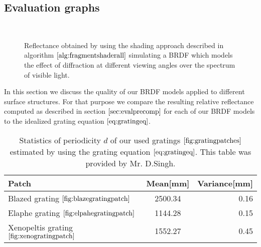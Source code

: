 \subsection{Evaluation graphs}

\begin{figure}[H]
  \centering
~
~

\caption{Reflectance obtained by using the shading approach described in algorithm $\ref{alg:fragmentshaderall}$ simulating a BRDF which models the effect of diffraction at different viewing angles over the spectrum of visible light.}

\label{fig:evaluationdiffshaderalllambda}
\end{figure}

In this section we discuss the quality of our BRDF models applied to different surface structures. For that purpose we compare the resulting relative reflectance computed as described in section $\ref{sec:evalprecomp}$ for each of our BRDF models to the idealized grating equation $\ref{eq:gratingeq}$. 

\begin{table}[H]
  \centering
  \begin{tabular}{| l | c | r |}
    \hline                       
    Patch & Mean[mm] & Variance[mm] \\
    \hline
    Blazed grating $\ref{fig:blazegratingpatch}$ & 2500.34 & 0.16 \\
    Elaphe grating $\ref{fig:elpahegratingpatch}$ & 1144.28 & 0.15 \\
    Xenopeltis grating $\ref{fig:xenogratingpatch}$ & 1552.27 & 0.45 \\
    \hline  
  \end{tabular}
\caption{Statistics of periodicity $d$ of our used gratings $\ref{fig:gratingpatches}$ estimated by using the grating equation $\ref{eq:gratingeq}$. This table was provided by Mr. D.Singh.}
\label{tab:gratingsmeanvariance}
\end{table}

